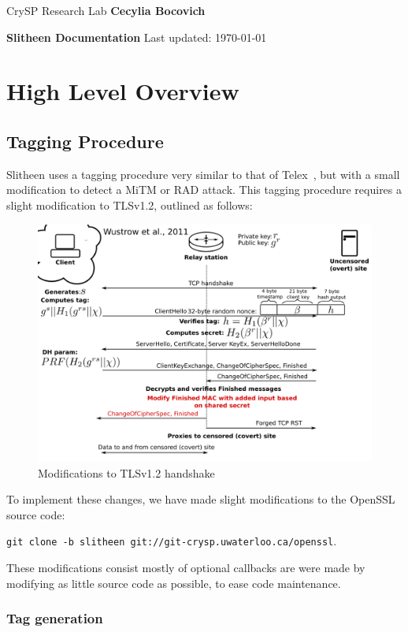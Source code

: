 \documentclass[11pt]{article}
\theoremstyle{definittion}
\begin{document}
\noindent
{\sffamily  CrySP Research Lab \hfill \bf\sffamily  Cecylia Bocovich}

\bigskip\medskip

\centerline{{\large\bf\sffamily Slitheen Documentation}  \hfill  Last updated: \today}

\section{High Level Overview}


\subsection{Tagging Procedure}

Slitheen uses a tagging procedure very similar to that of Telex~\cite{wustrow2011}, but with a small modification to detect a MiTM or RAD attack. This tagging procedure requires a slight modification to TLSv1.2, outlined as follows:

\begin{figure}[h]
\centering
\includegraphics[width=.75\textwidth]{tlsmods}
\caption{Modifications to TLSv1.2 handshake}
\end{figure}

To implement these changes, we have made slight modifications to the OpenSSL source code:

\texttt{git clone -b slitheen git://git-crysp.uwaterloo.ca/openssl}.

These modifications consist mostly of optional callbacks are were made by modifying as little source code as possible, to ease code maintenance.

\subsubsection{Tag generation}
\end{document}
